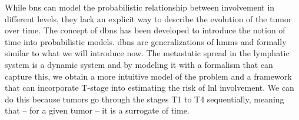 \documentclass[../ms.tex]{subfiles}
\begin{document}
While \glspl{bn} can model the probabilistic relationship between involvement in different levels, they lack an explicit way to describe the evolution of the tumor over time. The concept of \glspl{dbn} has been developed to introduce the notion of time into probabilistic models. \Glspl{dbn} are generalizations of \glspl{hmm} and formally similar to what we will introduce now. The metastatic spread in the lymphatic system is a dynamic system and by modeling it with a formalism that can capture this, we obtain a more intuitive model of the problem and a framework that can incorporate T-stage into estimating the risk of \gls{lnl} involvement. We can do this because tumors go through the stages T1 to T4 sequentially, meaning that – for a given tumor – it is a surrogate of time.
\end{document}

